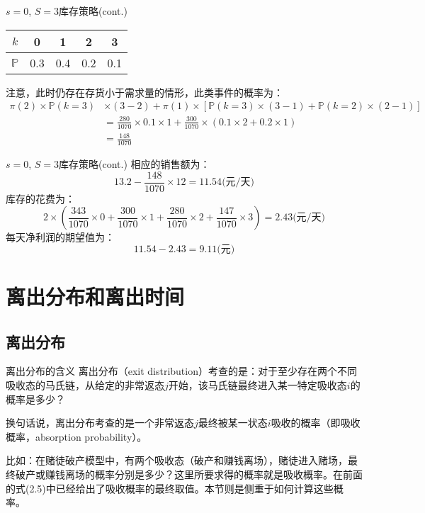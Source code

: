 \documentclass[t]{beamer}
\renewcommand{\Pr}{\mathbb{P}}
\begin{document}
\begin{frame}{$s=0$, $S=3$库存策略(cont.)}
\begin{center}
\begin{tabular}{c|cccc}
\hline
$k$ &0 &1& 2& 3\\
\hline
$\Pr$&0.3&0.4&0.2&0.1\\
\hline
\end{tabular}
\end{center}
注意，此时仍存在存货小于需求量的情形，此类事件的概率为：
\small
\[\begin{split}
\pi(2)\times\Pr(k=3)&\times(3-2) +\pi(1)\times \left[\Pr(k=3)\times(3-1)+\Pr(k=2)\times(2-1)\right]\\
&=\frac{280}{1070}\times 0.1\times 1+\frac{300}{1070}\times \left(0.1\times 2+0.2\times 1\right)\\
&=\frac{148}{1070}
\end{split}\]
\end{frame}



\begin{frame}{$s=0$, $S=3$库存策略(cont.)}
相应的销售额为：
\[13.2-\frac{148}{1070}\times 12=11.54\text{(元/天)}
\]
库存的花费为：
\[2\times \left(\frac{343}{1070}\times 0+\frac{300}{1070}\times 1+\frac{280}{1070}\times 2+\frac{147}{1070}\times 3\right)=2.43\text{(元/天)}\]
每天净利润的期望值为：
$$11.54-2.43=9.11\text{(元)}$$
\end{frame}



\section{离出分布和离出时间}

\subsection{离出分布}
\begin{frame}{离出分布的含义}
    离出分布（exit distribution）考查的是：对于至少存在两个不同吸收态的马氏链，从给定的非常返态$j$开始，该马氏链最终进入某一特定吸收态$i$的{概率}是多少？

    换句话说，离出分布考查的是一个非常返态$j$最终被某一状态$i$吸收的概率（即{吸收概率}，absorption probability）。
    
    比如：在赌徒破产模型中，有两个吸收态（破产和赚钱离场），赌徒进入赌场，最终破产或赚钱离场的概率分别是多少？这里所要求得的概率就是吸收概率。在前面的式(2.5)中已经给出了吸收概率的最终取值。本节则是侧重于如何计算这些概率。
\end{frame}
\end{document}

